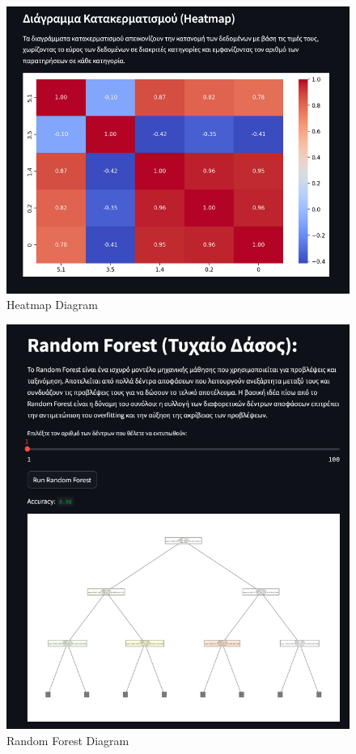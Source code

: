 \documentclass[unnumsec,webpdf,contemporary,large]{oup-authoring-template}%
\theoremstyle{thmstyleone}%
\theoremstyle{thmstyletwo}%
\theoremstyle{thmstylethree}%
\begin{document}
\begin{figure}
    \centering
    \includegraphics[width=1\linewidth]{heatmap.png}
    \caption{Heatmap Diagram}
    \label{fig:heatmap}
\end{figure}

\begin{figure}
    \centering
    \includegraphics[width=1\linewidth]{random-forest.png}
    \caption{Random Forest Diagram}
    \label{fig:random-forest}
\end{figure}
\end{document}

